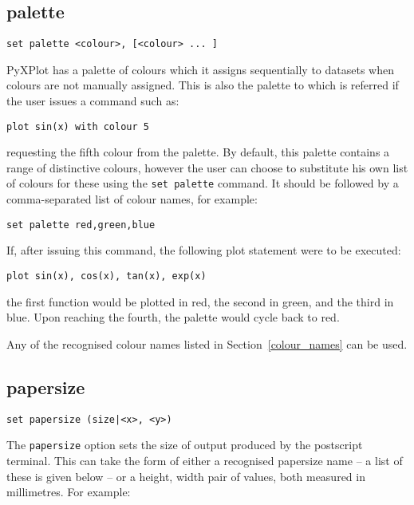 \documentclass[a4paper,onecolumn,11pt]{book}
\begin{document}
\subsection{palette}

\begin{verbatim}
set palette <colour>, [<colour> ... ]
\end{verbatim}

PyXPlot has a palette of colours which it assigns sequentially to datasets when
colours are not manually assigned. This is also the palette to which is
referred if the user issues a command such as:

\begin{verbatim}
plot sin(x) with colour 5
\end{verbatim}

\noindent requesting the fifth colour from the palette. By default, this palette contains
a range of distinctive colours, however the user can choose to substitute his
own list of colours for these using the {\tt set palette} command. It should be
followed by a comma-separated list of colour names, for example:

\begin{verbatim}
set palette red,green,blue
\end{verbatim}

If, after issuing this command, the following plot statement were to be
executed:

\begin{verbatim}
plot sin(x), cos(x), tan(x), exp(x)
\end{verbatim}

\noindent the first function would be plotted in red, the second in green, and the third
in blue. Upon reaching the fourth, the palette would cycle back to red.

Any of the recognised colour names listed in Section~\ref{colour_names} can be used.

\subsection{papersize}

\begin{verbatim}
set papersize (size|<x>, <y>)
\end{verbatim}

The {\tt papersize} option sets the size of output produced by the postscript
terminal. This can take the form of either a recognised papersize name -- a
list of these is given below -- or a height, width pair of values, both measured
in millimetres. For example:
\end{document}
